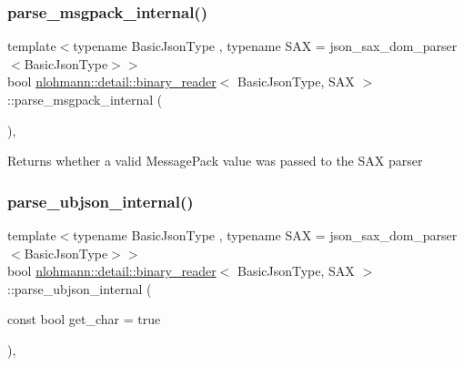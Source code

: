 \subsubsection{\texorpdfstring{parse\+\_\+msgpack\+\_\+internal()}{parse\_msgpack\_internal()}}
{\footnotesize\ttfamily template$<$typename Basic\+Json\+Type , typename S\+AX  = json\+\_\+sax\+\_\+dom\+\_\+parser$<$\+Basic\+Json\+Type$>$$>$ \\
bool \mbox{\hyperlink{classnlohmann_1_1detail_1_1binary__reader}{nlohmann\+::detail\+::binary\+\_\+reader}}$<$ Basic\+Json\+Type, S\+AX $>$\+::parse\+\_\+msgpack\+\_\+internal (\begin{DoxyParamCaption}{ }\end{DoxyParamCaption})\hspace{0.3cm}{\ttfamily [inline]}, {\ttfamily [private]}}

\begin{DoxyReturn}{Returns}
whether a valid Message\+Pack value was passed to the S\+AX parser 
\end{DoxyReturn}
\mbox{\label{classnlohmann_1_1detail_1_1binary__reader_af60c6bba6f1301cb02e0186c99e25751}} 
\subsubsection{\texorpdfstring{parse\+\_\+ubjson\+\_\+internal()}{parse\_ubjson\_internal()}}
{\footnotesize\ttfamily template$<$typename Basic\+Json\+Type , typename S\+AX  = json\+\_\+sax\+\_\+dom\+\_\+parser$<$\+Basic\+Json\+Type$>$$>$ \\
bool \mbox{\hyperlink{classnlohmann_1_1detail_1_1binary__reader}{nlohmann\+::detail\+::binary\+\_\+reader}}$<$ Basic\+Json\+Type, S\+AX $>$\+::parse\+\_\+ubjson\+\_\+internal (\begin{DoxyParamCaption}\item[{const bool}]{get\+\_\+char = {\ttfamily true} }\end{DoxyParamCaption})\hspace{0.3cm}{\ttfamily [inline]}, {\ttfamily [private]}}


